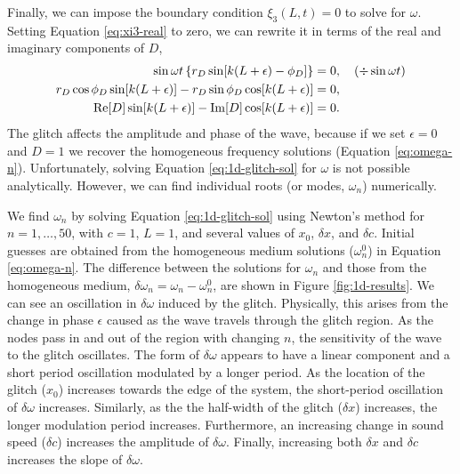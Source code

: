 Finally, we can impose the boundary condition \(\xi_3(L, t) = 0\) to solve for \(\omega\). Setting Equation \ref{eq:xi3-real} to zero, we can rewrite it in terms of the real and imaginary components of \(D\),
%
\begin{align}
    \sin \omega t \left\{r_D \sin[k(L + \epsilon) - \phi_D]\right\} &= 0, \quad (\div \sin \omega t) \notag \\
    r_D \cos \phi_D \sin[k(L + \epsilon)] - r_D \sin \phi_D \cos[k(L + \epsilon)] &= 0, \notag \\
    {\mathrm{Re}}[D] \sin[k(L + \epsilon)] - {\mathrm{Im}}[D] \cos[k(L + \epsilon)] &=0. \label{eq:1d-glitch-sol}
\end{align}
%
The glitch affects the amplitude and phase of the wave, because if we set \(\epsilon = 0\) and \(D = 1\) we recover the homogeneous frequency solutions (Equation \ref{eq:omega-n}). Unfortunately, solving Equation \ref{eq:1d-glitch-sol} for \(\omega\) is not possible analytically. However, we can find individual roots (or modes, \(\omega_n\)) numerically.

We find \(\omega_n\) by solving Equation \ref{eq:1d-glitch-sol} using Newton's method for \(n = 1,\dots,50\), with \(c=1\), \(L=1\), and several values of \(x_0\), \(\delta x\), and \(\delta c\). Initial guesses are obtained from the homogeneous medium solutions (\(\omega_n^0\)) in Equation \ref{eq:omega-n}. The difference between the solutions for \(\omega_n\) and those from the homogeneous medium, \(\delta \omega_n = \omega_n - \omega_n^0\), are shown in Figure \ref{fig:1d-results}. We can see an oscillation in \(\delta\omega\) induced by the glitch. Physically, this arises from the change in phase \(\epsilon\) caused as the wave travels through the glitch region. As the nodes pass in and out of the region with changing \(n\), the sensitivity of the wave to the glitch oscillates. The form of \(\delta\omega\) appears to have a linear component and a short period oscillation modulated by a longer period. As the location of the glitch (\(x_0\)) increases towards the edge of the system, the short-period oscillation of \(\delta\omega\) increases. Similarly, as the the half-width of the glitch (\(\delta x\)) increases, the longer modulation period increases. Furthermore, an increasing change in sound speed (\(\delta c\)) increases the amplitude of \(\delta\omega\). Finally, increasing both \(\delta x\) and \(\delta c\) increases the slope of \(\delta\omega\).

